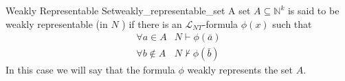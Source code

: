 \begin{definition}{Weakly Representable Set}{weakly_representable_set}
A set $A \subseteq \mathbb{N}^{k}$ is said to be weakly representable (in $N$ ) if there is an $\mathcal{L}_{N T}$-formula $\phi(x)$ such that
$$
\begin{array}{ll}
\forall a \in A & N \vdash \phi(\bar{a}) \\
\forall b \notin A & N \nvdash \phi(\bar{b})
\end{array}
$$
In this case we will say that the formula $\phi$ weakly represents the set $A$.
\end{definition}
